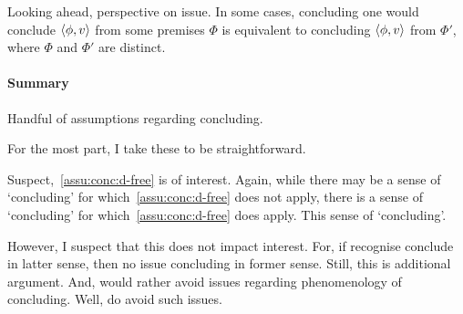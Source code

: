 \begin{note}
  Looking ahead, perspective on issue.
  In some cases, concluding one would conclude \(\langle \phi, v \rangle\) from some premises \(\Phi\) is equivalent to concluding \(\langle \phi, v \rangle\) from \(\Phi'\), where \(\Phi\) and \(\Phi'\) are distinct.
\end{note}

\paragraph*{Summary}

\begin{note}[Summary]
  Handful of assumptions regarding concluding.

  For the most part, I take these to be straightforward.

  Suspect,~\autoref{assu:conc:d-free} is of interest.
  Again, while there may be a sense of `concluding' for which~\autoref{assu:conc:d-free} does not apply, there is a sense of `concluding' for which~\autoref{assu:conc:d-free} does apply.
  This sense of `concluding'.

  However, I suspect that this does not impact interest.
  For, if recognise conclude in latter sense, then no issue concluding in former sense.
  Still, this is additional argument.
  And, would rather avoid issues regarding phenomenology of concluding.
  Well, do avoid such issues.
\end{note}


